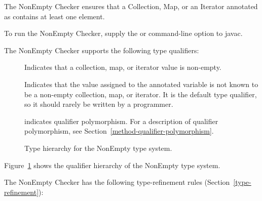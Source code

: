\htmlhr
{}

The NonEmpty Checker ensures that a Collection, Map, or an Iterator annotated as
 contains at least one element.

To run the NonEmpty Checker, supply the
or 
command-line option to javac.

The NonEmpty Checker supports the following type qualifiers:
\begin{description}

    \item[]
    Indicates that a collection, map, or iterator value is non-empty.

    \item[]
    Indicates that the value assigned to the annotated variable is not known to be a non-empty
    collection, map, or iterator. It is the default type
    qualifier, so it should rarely be written by a programmer.

    \item[]
    indicates qualifier polymorphism.
    For a description of qualifier polymorphism, see
    Section~\ref{method-qualifier-polymorphism}.

\end{description}

\begin{figure}
    \caption{Type hierarchy for the NonEmpty type system.}
    \label{fig-nonempty-hierarchy}
\end{figure}

Figure~\ref{fig-nonempty-hierarchy} shows the qualifier hierarchy of the NonEmpty type system.


The NonEmpty Checker has the following type-refinement rules (Section~\ref{type-refinement}):

